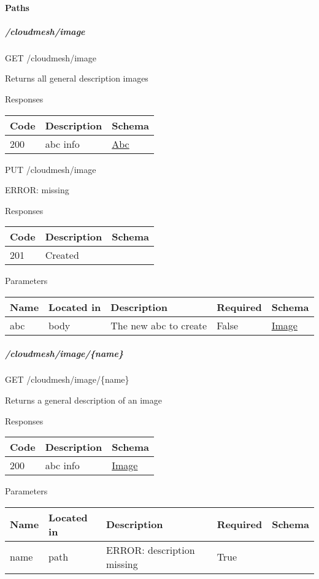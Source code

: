 \documentclass[9pt,]{article}
\let\oldparagraph\paragraph
\renewcommand{\paragraph}[1]{\oldparagraph{#1}\mbox{}}
\let\oldsubparagraph\subparagraph
\renewcommand{\subparagraph}[1]{\oldsubparagraph{#1}\mbox{}}
\begin{document}
\hypertarget{paths-13}{%
\paragraph{Paths}\label{paths-13}}

\hypertarget{cloudmeshimage}{%
\subparagraph{/cloudmesh/image}\label{cloudmeshimage}}

GET /cloudmesh/image

Returns all general description images

Responses

\begin{longtable}[]{@{}lll@{}}
\toprule
Code & Description & Schema\tabularnewline
\midrule
\endhead
200 & abc info & \protect\hyperlink{abc}{Abc}\tabularnewline
\bottomrule
\end{longtable}

PUT /cloudmesh/image

ERROR: missing

Responses

\begin{longtable}[]{@{}lll@{}}
\toprule
Code & Description & Schema\tabularnewline
\midrule
\endhead
201 & Created &\tabularnewline
\bottomrule
\end{longtable}

Parameters

\begin{longtable}[]{@{}lllll@{}}
\toprule
Name & Located in & Description & Required & Schema\tabularnewline
\midrule
\endhead
abc & body & The new abc to create & False &
\protect\hyperlink{image}{Image}\tabularnewline
\bottomrule
\end{longtable}

\hypertarget{cloudmeshimagename}{%
\subparagraph{/cloudmesh/image/\{name\}}\label{cloudmeshimagename}}

GET /cloudmesh/image/\{name\}

Returns a general description of an image

Responses

\begin{longtable}[]{@{}lll@{}}
\toprule
Code & Description & Schema\tabularnewline
\midrule
\endhead
200 & abc info & \protect\hyperlink{image}{Image}\tabularnewline
\bottomrule
\end{longtable}

Parameters

\begin{longtable}[]{@{}lllll@{}}
\toprule
Name & Located in & Description & Required & Schema\tabularnewline
\midrule
\endhead
name & path & ERROR: description missing & True &\tabularnewline
\bottomrule
\end{longtable}
\end{document}
